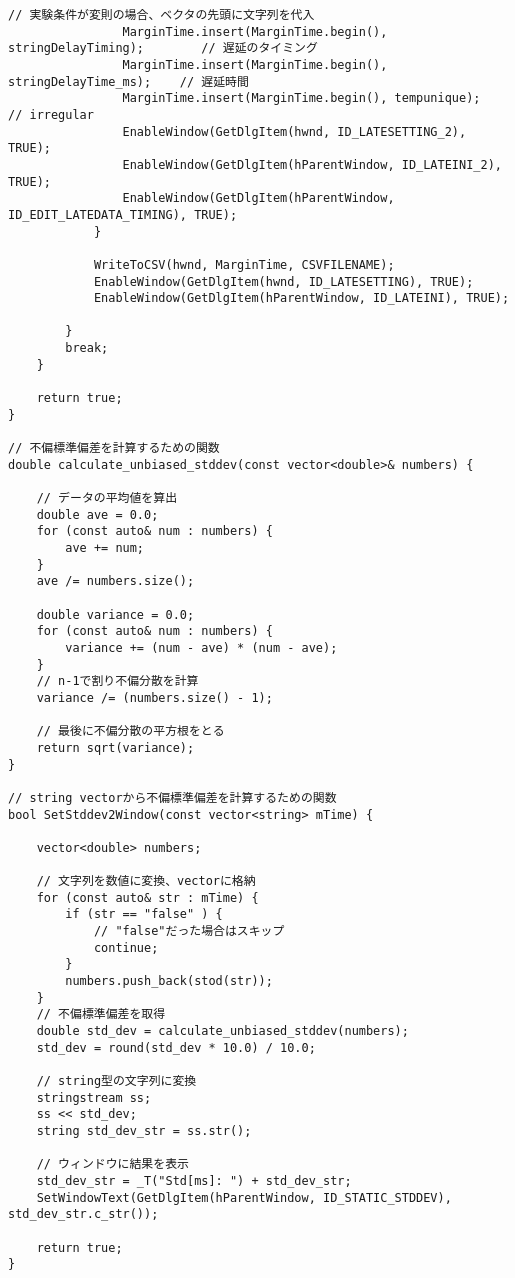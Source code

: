 \begin{lstlisting}[caption=main.cpp]
				// 実験条件が変則の場合、ベクタの先頭に文字列を代入
				MarginTime.insert(MarginTime.begin(), stringDelayTiming);        // 遅延のタイミング
				MarginTime.insert(MarginTime.begin(), stringDelayTime_ms);    // 遅延時間
				MarginTime.insert(MarginTime.begin(), tempunique);                // irregular
				EnableWindow(GetDlgItem(hwnd, ID_LATESETTING_2), TRUE);
				EnableWindow(GetDlgItem(hParentWindow, ID_LATEINI_2), TRUE);
				EnableWindow(GetDlgItem(hParentWindow, ID_EDIT_LATEDATA_TIMING), TRUE);
			}
			
			WriteToCSV(hwnd, MarginTime, CSVFILENAME);
			EnableWindow(GetDlgItem(hwnd, ID_LATESETTING), TRUE);        
			EnableWindow(GetDlgItem(hParentWindow, ID_LATEINI), TRUE);

		}
		break;
	}

	return true;
}

// 不偏標準偏差を計算するための関数
double calculate_unbiased_stddev(const vector<double>& numbers) {

	// データの平均値を算出
	double ave = 0.0;
	for (const auto& num : numbers) {
		ave += num;
	}
	ave /= numbers.size();

	double variance = 0.0;
	for (const auto& num : numbers) {
		variance += (num - ave) * (num - ave);
	}
	// n-1で割り不偏分散を計算
	variance /= (numbers.size() - 1);
	
	// 最後に不偏分散の平方根をとる
	return sqrt(variance);
}

// string vectorから不偏標準偏差を計算するための関数
bool SetStddev2Window(const vector<string> mTime) {

	vector<double> numbers;

	// 文字列を数値に変換、vectorに格納
	for (const auto& str : mTime) {
		if (str == "false" ) {
			// "false"だった場合はスキップ
			continue;
		}
		numbers.push_back(stod(str));
	}
	// 不偏標準偏差を取得
	double std_dev = calculate_unbiased_stddev(numbers);
	std_dev = round(std_dev * 10.0) / 10.0;

	// string型の文字列に変換
	stringstream ss;
	ss << std_dev;
	string std_dev_str = ss.str();

	// ウィンドウに結果を表示
	std_dev_str = _T("Std[ms]: ") + std_dev_str;
	SetWindowText(GetDlgItem(hParentWindow, ID_STATIC_STDDEV), std_dev_str.c_str());

	return true;
}
\end{lstlisting}

